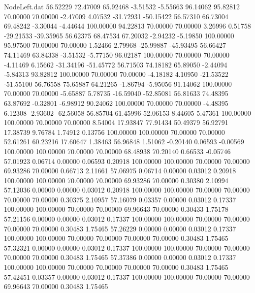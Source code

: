 \begin{filecontents}{NodeLeft.dat}
  56.52229   72.47009   65.92468    -3.51532   -5.55663   96.14062   95.82812   70.00000   70.00000   -2.47009    4.07532  -31.72931  -50.15422
  56.57310   66.73004   69.48242    -3.30044   -4.44644  100.00000   94.22813   70.00000   70.00000    3.26996    0.51758  -29.21533  -39.35965
  56.62375   68.47534   67.20032    -2.94232   -5.19850  100.00000   95.97500   70.00000   70.00000    1.52466    2.79968  -25.99887  -45.93495
  56.66427   74.11469   63.84338    -3.51532   -5.77150   96.02187  100.00000   70.00000   70.00000   -4.11469    6.15662  -31.34196  -51.45772
  56.71503   74.18182   65.89050    -2.44094   -5.84313   93.82812  100.00000   70.00000   70.00000   -4.18182    4.10950  -21.53522  -51.55100
  56.76558   75.65887   64.21265    -1.86794   -5.95056   91.14062  100.00000   70.00000   70.00000   -5.65887    5.78735  -16.59040  -52.85081
  56.81633   74.48395   63.87692    -0.32801   -6.98912   90.24062  100.00000   70.00000   70.00000   -4.48395    6.12308   -2.93602  -62.56058
  56.85704   61.45996   52.06153     8.44605    5.47361  100.00000  100.00000   70.00000   70.00000    8.54004   17.93847   77.91434   50.49379
  56.92791   17.38739    9.76784     1.74912    0.13756  100.00000  100.00000   70.00000   70.00000   52.61261   60.23216   17.60647    1.38463
  56.96848    1.51062   -0.20140     0.06593   -0.00569  100.00000  100.00000   70.00000   70.00000   68.48938   70.20140    0.66533   -0.05746
  57.01923    0.06714    0.00000     0.06593    0.20918  100.00000  100.00000   70.00000   70.00000   69.93286   70.00000    0.66713    2.11661
  57.06975    0.06714    0.00000     0.03012    0.20918  100.00000  100.00000   70.00000   70.00000   69.93286   70.00000    0.30380    2.10994
  57.12036    0.00000    0.00000     0.03012    0.20918  100.00000  100.00000   70.00000   70.00000   70.00000   70.00000    0.30375    2.10957
  57.16079    0.03357    0.00000     0.03012    0.17337  100.00000  100.00000   70.00000   70.00000   69.96643   70.00000    0.30433    1.75178
  57.21156    0.00000    0.00000     0.03012    0.17337  100.00000  100.00000   70.00000   70.00000   70.00000   70.00000    0.30483    1.75465
  57.26229    0.00000    0.00000     0.03012    0.17337  100.00000  100.00000   70.00000   70.00000   70.00000   70.00000    0.30483    1.75465
  57.32321    0.00000    0.00000     0.03012    0.17337  100.00000  100.00000   70.00000   70.00000   70.00000   70.00000    0.30483    1.75465
  57.37386    0.00000    0.00000     0.03012    0.17337  100.00000  100.00000   70.00000   70.00000   70.00000   70.00000    0.30483    1.75465
  57.42451    0.03357    0.00000     0.03012    0.17337  100.00000  100.00000   70.00000   70.00000   69.96643   70.00000    0.30483    1.75465

\end{filecontents}
